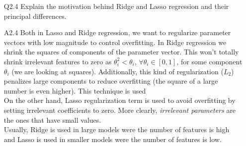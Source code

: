 \documentclass[11pt]{scrartcl}
\begin{document}
\begin{itemize}
\item[Q2.4] Explain the motivation behind Ridge and Lasso regression and their principal differences.
\item[A2.4] Both in Lasso and Ridge regression, we want to regularize parameter vectors with low magnitude to control overfitting. In Ridge regression we shrink the squares of components of the parameter vector. This won't totally shrink irrelevant features to zero as $\theta_i^2 < \theta_i$, $\forall \theta_i \in [0,1]$, for some component $\theta_i$ (we are looking at squares). Additionally, this kind of regularization ($L_2$) penalizes large components to reduce overfitting (the square of a large number is even higher). This technique is used \\
On the other hand, Lasso regularization term is used to avoid overfitting by setting irrelevant coefficients to zero. More clearly, \textit{irrelevant parameters} are the ones that have small values.\\
Usually, Ridge is used in large models were the number of features is high and Lasso is used in smaller models were the number of features is low.
\end{itemize}
\end{document}

